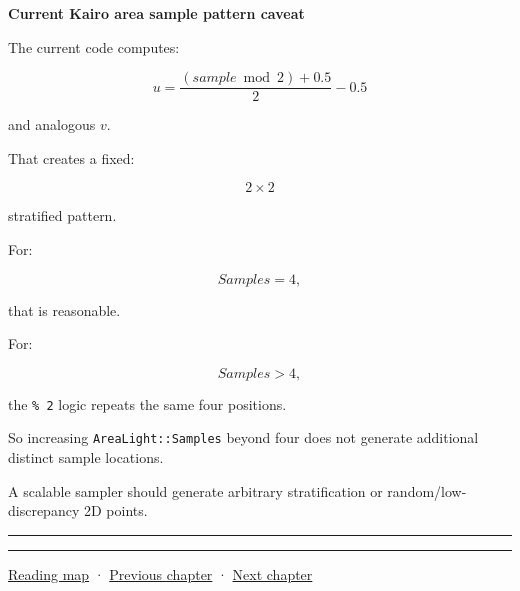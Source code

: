 \textbf{Current Kairo area sample pattern caveat}

The current code computes:

\[
u=
\frac{
(sample\bmod2)+0.5
}{2}
-0.5
\]

and analogous \(v\).

That creates a fixed:

\[
2\times2
\]

stratified pattern.

For:

\[
Samples=4,
\]

that is reasonable.

For:

\[
Samples>4,
\]

the \texttt{\%\ 2} logic repeats the same four positions.

So increasing \texttt{AreaLight::Samples} beyond four does not generate additional distinct sample locations.

A scalable sampler should generate arbitrary stratification or random/low-discrepancy 2D points.

\begin{center}\rule{0.5\linewidth}{0.5pt}\end{center}

\begin{center}\rule{0.5\linewidth}{0.5pt}\end{center}

\hyperref[volume-reading-map]{Reading map} · \hyperref[03-visual-computing-i-ch007-the-rendering-equation-and-path-probabilities]{Previous chapter} · \hyperref[03-visual-computing-i-ch009-point-lights-mis-and-environment-lighting]{Next chapter}
